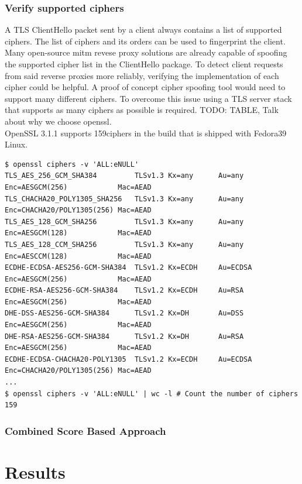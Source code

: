 \documentclass[12pt]{report}
\begin{document}
\newpage
\subsection{Verify supported ciphers}
A TLS ClientHello packet sent by a client always contains a list of supported ciphers. The list of ciphers and its orders can be used to fingerprint the client. Many open-source mitm revese proxy solutions are already capable of spoofing the supported cipher list in the ClientHello package. To detect client requests from said reverse proxies more reliably, verifying the implementation of each cipher could be helpful. A proof of concept cipher spoofing tool would need to support many different ciphers. To overcome this issue using a TLS server stack that supports as many ciphers as possible is required. TODO: TABLE, Talk about why we choose openssl.\\OpenSSL 3.1.1 supports 159ciphers in the build that is shipped with Fedora39 Linux.

\begin{lstlisting}[breaklines=true,basicstyle=\tiny]
$ openssl ciphers -v 'ALL:eNULL'
TLS_AES_256_GCM_SHA384         TLSv1.3 Kx=any      Au=any   Enc=AESGCM(256)            Mac=AEAD
TLS_CHACHA20_POLY1305_SHA256   TLSv1.3 Kx=any      Au=any   Enc=CHACHA20/POLY1305(256) Mac=AEAD
TLS_AES_128_GCM_SHA256         TLSv1.3 Kx=any      Au=any   Enc=AESGCM(128)            Mac=AEAD
TLS_AES_128_CCM_SHA256         TLSv1.3 Kx=any      Au=any   Enc=AESCCM(128)            Mac=AEAD
ECDHE-ECDSA-AES256-GCM-SHA384  TLSv1.2 Kx=ECDH     Au=ECDSA Enc=AESGCM(256)            Mac=AEAD
ECDHE-RSA-AES256-GCM-SHA384    TLSv1.2 Kx=ECDH     Au=RSA   Enc=AESGCM(256)            Mac=AEAD
DHE-DSS-AES256-GCM-SHA384      TLSv1.2 Kx=DH       Au=DSS   Enc=AESGCM(256)            Mac=AEAD
DHE-RSA-AES256-GCM-SHA384      TLSv1.2 Kx=DH       Au=RSA   Enc=AESGCM(256)            Mac=AEAD
ECDHE-ECDSA-CHACHA20-POLY1305  TLSv1.2 Kx=ECDH     Au=ECDSA Enc=CHACHA20/POLY1305(256) Mac=AEAD
...
$ openssl ciphers -v 'ALL:eNULL' | wc -l # Count the number of ciphers
159
\end{lstlisting}

\newpage
\subsection{Combined Score Based Approach}

\chapter{Results}
\end{document}
